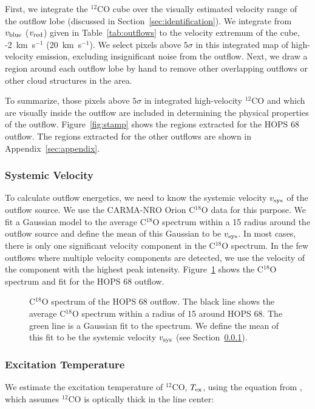\documentclass[twocolumn]{aastex63}
\newcommand{\example}{HOPS 68}
\newcommand{\tex}{$T_{\rm ex}$}
\newcommand{\kms}{km~s$^{-1}$}
\begin{document}
First, we integrate the $^{12}$CO cube over the visually estimated velocity range of the outflow lobe (discussed in Section~\ref{sec:identification}). We integrate from $v_{\rm blue}$ ($v_{\rm red}$) given in Table~\ref{tab:outflows} to the velocity extremum of the cube, -2~\kms{} (20~\kms{}). We select pixels above $5\sigma$ in this integrated map of high-velocity emission, excluding insignificant noise from the outflow. Next, we draw a region around each outflow lobe by hand to remove other overlapping outflows or other cloud structures in the area. %

To summarize, those pixels above $5\sigma$ in integrated high-velocity $^{12}$CO and which are visually inside the outflow are included in determining the physical properties of the outflow. Figure~\ref{fig:stamp} shows the regions extracted for the \example{} outflow. The regions extracted for the other outflows are shown in Appendix~\ref{sec:appendix}. 

\subsubsection{Systemic Velocity}\label{sec:vsys}
To calculate outflow energetics, we need to know the systemic velocity $v_{\rm sys}$ of the outflow source. We use the CARMA-NRO Orion C$^{18}$O data \citep{Kong18} for this purpose. We fit a Gaussian model to the average C$^{18}$O spectrum within a 15\arcsec{} radius around the outflow source and define the mean of this Gaussian to be $v_{\rm sys}$. In most cases, there is only one significant velocity component in the C$^{18}$O spectrum. In the few outflows where multiple velocity components are detected, we use the velocity of the component with the highest peak intensity. Figure~\ref{fig:c18o_fit} shows the C$^{18}$O spectrum and fit for the \example{} outflow.

\begin{figure}
\caption{C$^{18}$O spectrum of the \example{} outflow. The black line shows the average C$^{18}$O spectrum within a radius of 15\arcsec{} around \example{}. The green line is a Gaussian fit to the spectrum. We define the mean of this fit to be the systemic velocity $v_{\rm sys}$ (see Section~\ref{sec:vsys}). \label{fig:c18o_fit}}
\end{figure}

\subsubsection{Excitation Temperature}\label{sec:tex}
We estimate the excitation temperature of $^{12}$CO, \tex, using the equation from \citet{Rohlfs96}, which assumes $^{12}$CO is optically thick in the line center:
\end{document}
